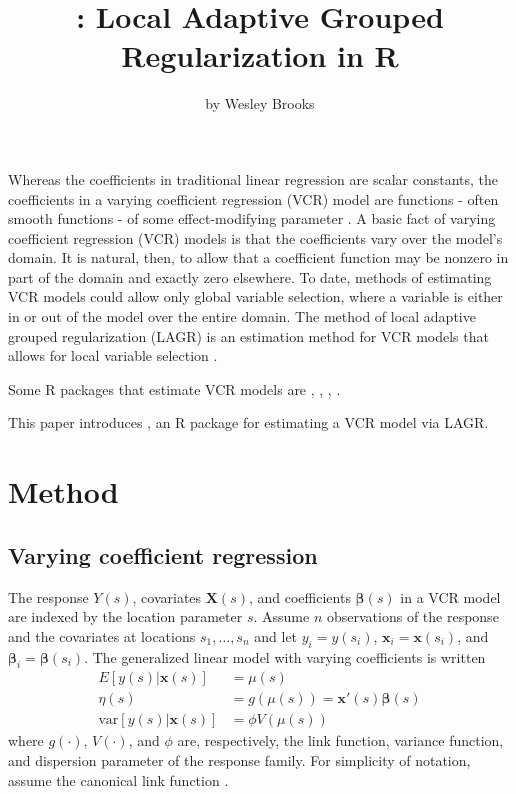 \title{: Local Adaptive Grouped Regularization in R}
\author{by Wesley Brooks}

\maketitle




Whereas the coefficients in traditional linear regression are scalar constants, the coefficients in a varying coefficient regression (VCR) model are functions - often smooth functions - of some effect-modifying parameter \citep{Cleveland-Grosse-1991,Hastie-Tibshirani-1993}. A basic fact of varying coefficient regression (VCR) models is that the coefficients vary over the model's domain. It is natural, then, to allow that a coefficient function may be nonzero in part of the domain and exactly zero elsewhere. To date, methods of estimating VCR models could allow only global variable selection, where a variable is either in or out of the model over the entire domain. The method of local adaptive grouped regularization (LAGR) is an estimation method for VCR models that allows for local variable selection \citep{Brooks-Zhu-Lu-2014}.

Some R packages that estimate VCR models are , , , . 
 
This paper introduces , an R package for estimating a VCR model via LAGR. 

\section{Method}
\subsection{Varying coefficient regression}
The response $Y(s)$, covariates $\bm{X}(s)$, and coefficients $\bm{\beta}(s)$ in a VCR model are indexed by the location parameter $s$. Assume $n$ observations of the response and the covariates at locations $s_1, \dots, s_n$ and let $y_i = y(s_i)$, $\bm{x}_i = \bm{x}(s_i)$, and $\bm{\beta}_i = \bm{\beta}(s_i)$. The generalized linear model with varying coefficients is written
\begin{align}
	E[y(s)|\bm{x}(s)] &= \mu(s)\\
	\eta(s) &= g(\mu(s)) = \bm{x}'(s) \bm{\beta}(s)\\
	\text{var}[y(s)|\bm{x}(s)] &= \phi V(\mu(s))
\end{align}
where $g(\cdot)$, $V(\cdot)$, and $\phi$ are, respectively, the link function, variance function, and dispersion parameter of the response family. For simplicity of notation, assume the canonical link function \citep{McCullagh-Nelder-1989}.

